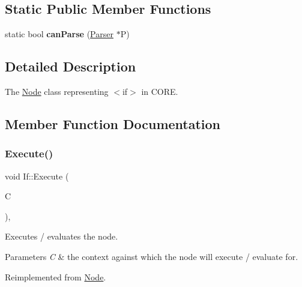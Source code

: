 \subsection*{Static Public Member Functions}
\begin{DoxyCompactItemize}
\item 
\mbox{\label{class_if_ae781a9923357b233479c133e925186d3}} 
static bool {\bfseries can\+Parse} (\mbox{\hyperlink{class_parser}{Parser}} $\ast$P)
\end{DoxyCompactItemize}


\subsection{Detailed Description}
The \mbox{\hyperlink{class_node}{Node}} class representing {\ttfamily $<$if$>$} in C\+O\+RE. 

\subsection{Member Function Documentation}
\mbox{\label{class_if_a930c6955a625beebaa3e61527aacfa39}} 
\subsubsection{\texorpdfstring{Execute()}{Execute()}}
{\footnotesize\ttfamily void If\+::\+Execute (\begin{DoxyParamCaption}\item[{\mbox{\hyperlink{class_a_s_t_context}{A\+S\+T\+Context}} \&}]{C }\end{DoxyParamCaption})\hspace{0.3cm}{\ttfamily [override]}, {\ttfamily [virtual]}}

Executes / evaluates the node. 
\begin{DoxyParams}{Parameters}
{\em C} & the context against which the node will execute / evaluate for. \\
\hline
\end{DoxyParams}


Reimplemented from \mbox{\hyperlink{class_node_a27ad1ba81d2596817b361368282bcbfa}{Node}}.

\mbox{\label{class_if_a3a58cc0b16902cc935c9edce7fc70ff6}} 
